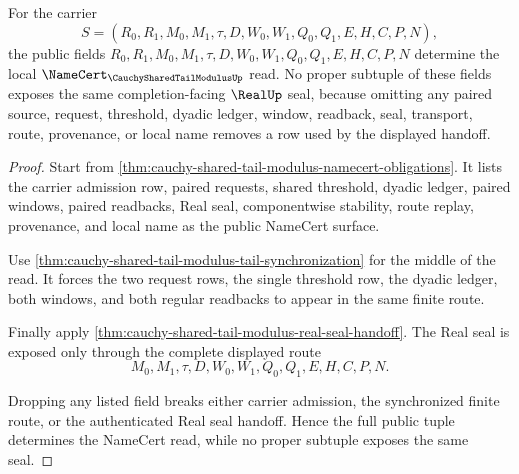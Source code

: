 \begin{theorem}
\label{thm:cauchy-shared-tail-modulus-field-faithfulness-obligation}
For the carrier
$$
S=(R_0,R_1,M_0,M_1,\tau,D,W_0,W_1,Q_0,Q_1,E,H,C,P,N),
$$
the public fields $R_0,R_1,M_0,M_1,\tau,D,W_0,W_1,Q_0,Q_1,E,H,C,P,N$ determine the local $\NameCert_{\CauchySharedTailModulusUp}$ read. No proper subtuple of these fields exposes the same completion-facing $\RealUp$ seal, because omitting any paired source, request, threshold, dyadic ledger, window, readback, seal, transport, route, provenance, or local name removes a row used by the displayed handoff.
\end{theorem}
\begin{proof}
Start from \autoref{thm:cauchy-shared-tail-modulus-namecert-obligations}. It lists the carrier admission row, paired requests, shared threshold, dyadic ledger, paired windows, paired readbacks, Real seal, componentwise stability, route replay, provenance, and local name as the public NameCert surface.

Use \autoref{thm:cauchy-shared-tail-modulus-tail-synchronization} for the middle of the read. It forces the two request rows, the single threshold row, the dyadic ledger, both windows, and both regular readbacks to appear in the same finite route.

Finally apply \autoref{thm:cauchy-shared-tail-modulus-real-seal-handoff}. The Real seal is exposed only through the complete displayed route
$$
M_0,M_1,\tau,D,W_0,W_1,Q_0,Q_1,E,H,C,P,N.
$$

Dropping any listed field breaks either carrier admission, the synchronized finite route, or the authenticated Real seal handoff. Hence the full public tuple determines the NameCert read, while no proper subtuple exposes the same seal.
\end{proof}

